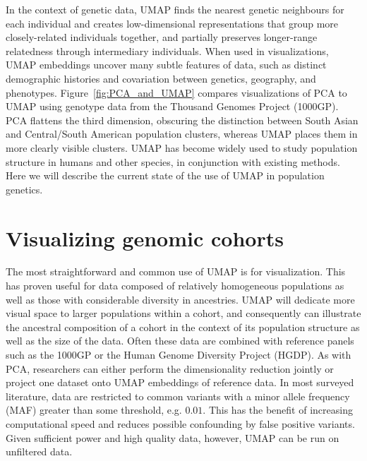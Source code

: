 \documentclass[12pt]{article}
\begin{document}
In the context of genetic data, UMAP finds the nearest genetic neighbours for each individual and creates low-dimensional representations that group more closely-related individuals together, and partially preserves longer-range relatedness through intermediary individuals. When used in visualizations, UMAP embeddings uncover many subtle features of data, such as distinct demographic histories and covariation between genetics, geography, and phenotypes\cite{diaz-papkovich_umap_2019}. Figure~\ref{fig:PCA_and_UMAP} compares visualizations of PCA to UMAP using genotype data from the Thousand Genomes Project (1000GP)\cite{10002015global}. PCA flattens the third dimension, obscuring the distinction between South Asian and Central/South American population clusters, whereas UMAP places them in more clearly visible clusters. UMAP has become widely used to study population structure in humans and other species, in conjunction with existing methods. Here we will describe the current state of the use of UMAP in population genetics.



\section*{Visualizing genomic cohorts}
The most straightforward and common use of UMAP is for visualization. This has proven useful for data composed of relatively homogeneous populations as well as those with considerable diversity in ancestries. UMAP will dedicate more visual space to larger populations within a cohort, and consequently can illustrate the ancestral composition of a cohort in the context of its population structure as well as the size of the data. Often these data are combined with reference panels such as the 1000GP or the Human Genome Diversity Project (HGDP)\cite{cann2002human}.  As with PCA, researchers can either perform the dimensionality reduction jointly or project one dataset onto UMAP embeddings of reference data. In most surveyed literature, data are restricted to common variants with a minor allele frequency (MAF) greater than some threshold, e.g. $0.01$. This has the benefit of increasing computational speed and reduces possible confounding by false positive variants. Given sufficient power and high quality data, however, UMAP can be run on unfiltered data.
\end{document}
